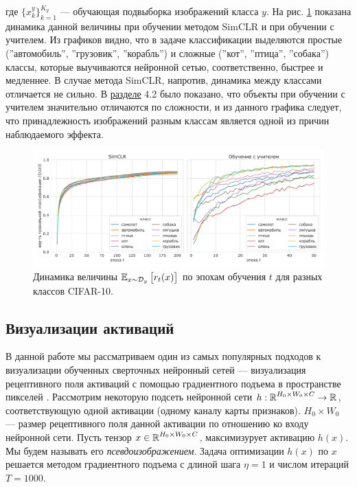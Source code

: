 \noindent
где $\{x_k^y\}_{k=1}^{K_y}$ --- обучающая подвыборка изображений класса $y$. На рис. \ref{visual:pic:3} показана динамика данной величины при обучении методом SimCLR и при обучении с учителем. Из графиков видно, что в задаче классификации выделяются простые (''автомобиль'', ''грузовик'', ''корабль'') и сложные (''кот'', ''птица'', ''собака'') классы, которые выучиваются нейронной сетью, соответственно, быстрее и медленнее. В случае метода SimCLR, напротив, динамика между классами отличается не сильно. В \hyperref[experiments:1]{разделе} 4.2 было показано, что объекты при обучении с учителем значительно отличаются по сложности, и из данного графика следует, что принадлежность изображений разным классам является одной из причин наблюдаемого эффекта.

\begin{figure}[H]
    \centering
    \includegraphics[width=17cm]{images/class_difficulties.pdf}
    \caption{Динамика величины $\operatorname{\mathbb{E}}_{x \sim \mathcal{D}_y} \big[r_t(x)\big]$ по эпохам обучения $t$ для разных классов CIFAR-10.}
    \label{visual:pic:3}
\end{figure}{}

\subsection{Визуализации активаций}

В данной работе мы рассматриваем один из самых популярных подходов к визуализации обученных сверточных нейронный сетей --- визуализация рецептивного поля активаций с помощью градиентного подъема в пространстве пикселей \cite{visual}. Рассмотрим некоторую подсеть нейронной сети \linebreak $h: \operatorname{\mathbb{R}}^{H_0 \times W_0 \times C} \rightarrow \operatorname{\mathbb{R}}$, соответствующую одной активации (одному каналу карты признаков). $H_0 \times W_0$ --- размер рецептивного поля данной активации по отношению ко входу нейронной сети. Пусть тензор $x \in \operatorname{\mathbb{R}}^{H_0 \times W_0 \times C}$, максимизурует активацию $h(x)$. Мы будем называть его \textit{псевдоизображением}. Задача оптимизации $h(x)$ по $x$ решается методом градиентного подъема с длиной шага $\eta=1$ и числом итераций $T=1000$. 


